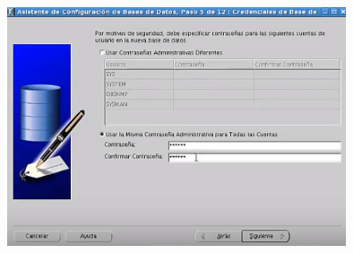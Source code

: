 \documentclass[12pt,letterpaper]{article}
\begin{document}
\begin{center}
\includegraphics[width=10cm]{oraclelinux/40.png}
\end{center}
\end{document}
